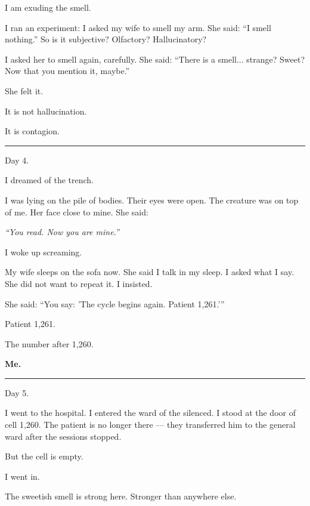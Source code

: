 \noindent I am exuding the smell.

\noindent I ran an experiment: I asked my wife to smell my arm. She said: \textquotedblleft{}I smell nothing.\textquotedblright{} So is it subjective? Olfactory? Hallucinatory?

\noindent I asked her to smell again, carefully. She said: \textquotedblleft{}There is a smell... strange? Sweet? Now that you mention it, maybe.\textquotedblright{}

\noindent She felt it.

\noindent It is not hallucination.

\noindent It is contagion.

\vspace{0.5em}\noindent\rule{\textwidth}{0.5pt}\vspace{0.5em}

\noindent Day 4.

\noindent I dreamed of the trench.

\noindent I was lying on the pile of bodies. Their eyes were open. The creature was on top of me. Her face close to mine. She said:

\noindent \textit{\textquotedblleft{}You read. Now you are mine.\textquotedblright{}}

\noindent I woke up screaming.

\noindent My wife sleeps on the sofa now. She said I talk in my sleep. I asked what I say. She did not want to repeat it. I insisted.

\noindent She said: \textquotedblleft{}You say: 'The cycle begins again. Patient 1,261.'\textquotedblright{}

\noindent Patient 1,261.

\noindent The number after 1,260.

\noindent \textbf{Me.}

\vspace{0.5em}\noindent\rule{\textwidth}{0.5pt}\vspace{0.5em}

\noindent Day 5.

\noindent I went to the hospital. I entered the ward of the silenced. I stood at the door of cell 1,260. The patient is no longer there --- they transferred him to the general ward after the sessions stopped.

\noindent But the cell is empty.

\noindent I went in.

\noindent The sweetish smell is strong here. Stronger than anywhere else.

